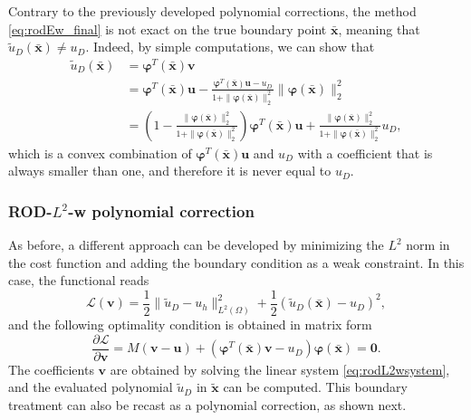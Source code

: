 \documentclass{article}
\renewcommand{\phi}{\varphi}
\begin{document}
Contrary to the previously developed polynomial corrections, the method \eqref{eq:rodEw_final} is not exact on the true boundary point $\bar{\boldsymbol{x}}$, meaning that $\tilde u_D(\bar{\boldsymbol{x}})\ne u_D$. Indeed, by simple computations, we can show that
\begin{equation}
    \begin{split}
    \tilde u_D(\bar{\boldsymbol{x}}) &= \boldsymbol{\phi}^T(\bar{\boldsymbol{x}}) \boldsymbol{v} \\
    &= \boldsymbol{\phi}^T(\bar{\boldsymbol{x}}) \boldsymbol{u} - \frac{\boldsymbol{\phi}^T(\bar{\boldsymbol{x}})\boldsymbol{u} - u_D}{1 + \|\boldsymbol{\phi}(\bar{\boldsymbol{x}})\|^2_2} \|\boldsymbol{\phi}(\bar{\boldsymbol{x}})\|^2_2 \\
    &= \left(1 - \frac{\|\boldsymbol{\phi}(\bar{\boldsymbol{x}})\|^2_2}{1 + \|\boldsymbol{\phi}(\bar{\boldsymbol{x}})\|^2_2}\right) \boldsymbol{\phi}^T(\bar{\boldsymbol{x}}) \boldsymbol{u} + \frac{\|\boldsymbol{\phi}(\bar{\boldsymbol{x}})\|^2_2}{1 + \|\boldsymbol{\phi}(\bar{\boldsymbol{x}})\|^2_2} u_D ,
    \end{split}
\end{equation}
which is a convex combination of $\boldsymbol{\phi}^T(\bar{\boldsymbol{x}}) \boldsymbol{u}$ and $u_D$ with a coefficient that is always smaller than one, and therefore it is never equal to $u_D$.


\subsubsection{ROD-\texorpdfstring{$L^2$}{L2}-w polynomial correction}

As before, a different approach can be developed by minimizing the $L^2$ norm in the cost function and adding the boundary condition as a weak constraint. In this case, the functional reads
\begin{equation}
     \mathcal{L}(\boldsymbol{v}) = \frac12 \|\tilde u_D - u_h\|^2_{L^2(\Omega)} +  \frac12(\tilde u_D(\bar{\boldsymbol{x}}) - u_D)^2,
\end{equation}
and the following optimality condition is obtained in matrix form
\begin{equation}\label{eq:rodL2wsystem}
    \frac{\partial \mathcal{L}}{\partial \boldsymbol{v}} = M(\boldsymbol{v} - \boldsymbol{u}) + (\boldsymbol{\phi}^T(\bar{\boldsymbol{x}}) \boldsymbol{v} - u_D) \boldsymbol{\phi}(\bar{\boldsymbol{x}}) = \boldsymbol{0}.
\end{equation}
The coefficients $\boldsymbol{v}$ are obtained by solving the linear system \eqref{eq:rodL2wsystem}, and the evaluated polynomial $\tilde u_D$ in $\tilde{\boldsymbol{x}}$ can be computed. This boundary treatment can also be recast as a polynomial correction, as shown next. 
\end{document}
